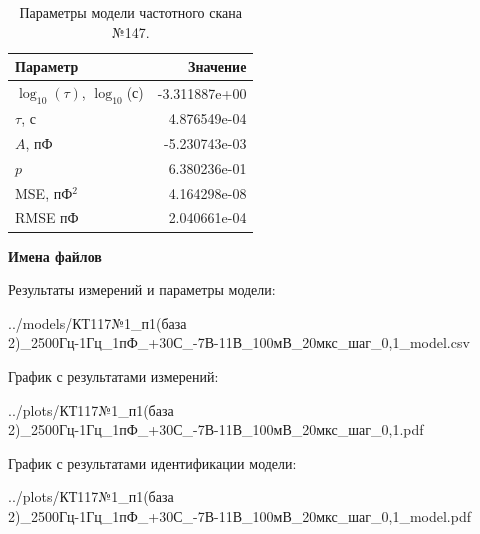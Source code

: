 \begin{table}[!ht]
    \centering
    \caption{Параметры модели частотного скана №147.}
    \begin{tabular}{|l|r|}
        \hline
        Параметр                                       & Значение                  \\ \hline
        $\log_{10}(\tau)$, $\log_{10}$(с)              & -3.311887e+00             \\ \hline
        $\tau$, с                                      & 4.876549e-04              \\ \hline
        $A$, пФ                                        & -5.230743e-03             \\ \hline
        $p$                                            & 6.380236e-01              \\ \hline
        MSE, пФ$^2$                                    & 4.164298e-08              \\ \hline
        RMSE пФ                                        & 2.040661e-04              \\ \hline
    \end{tabular}
    \label{table:frequency_scan_model_147}
\end{table}

\textbf{Имена файлов}

Результаты измерений и параметры модели:

\scriptsize../models/КТ117№1\_п1(база 2)\_2500Гц-1Гц\_1пФ\_+30С\_-7В-11В\_100мВ\_20мкс\_шаг\_0,1\_model.csv
\normalsize

График с результатами измерений:

\scriptsize../plots/КТ117№1\_п1(база 2)\_2500Гц-1Гц\_1пФ\_+30С\_-7В-11В\_100мВ\_20мкс\_шаг\_0,1.pdf
\normalsize

График с результатами идентификации модели:

\scriptsize../plots/КТ117№1\_п1(база 2)\_2500Гц-1Гц\_1пФ\_+30С\_-7В-11В\_100мВ\_20мкс\_шаг\_0,1\_model.pdf
\normalsize

